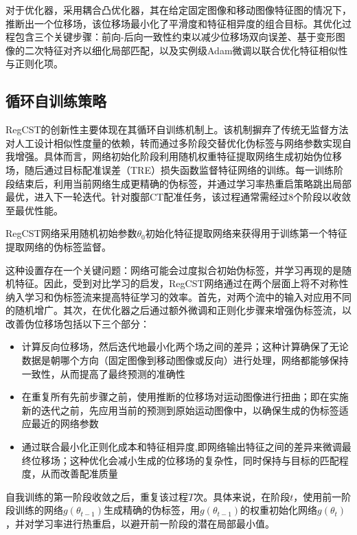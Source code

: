 对于优化器，采用耦合凸优化器\cite{siebert2022learn}，其在给定固定图像和移动图像特征图的情况下，推断出一个位移场，该位移场最小化了平滑度和特征相异度的组合目标。其优化过程包含三个关键步骤：前向-后向一致性约束以减少位移场双向误差、基于变形图像的二次特征对齐以细化局部匹配，以及实例级Adam微调以联合优化特征相似性与正则化项。

\subsection{循环自训练策略}

RegCST的创新性主要体现在其循环自训练机制上。该机制摒弃了传统无监督方法对人工设计相似性度量的依赖，转而通过多阶段交替优化伪标签与网络参数实现自我增强。具体而言，网络初始化阶段利用随机权重特征提取网络生成初始伪位移场，随后通过目标配准误差（TRE）损失函数监督特征网络的训练。每一训练阶段结束后，利用当前网络生成更精确的伪标签，并通过学习率热重启策略跳出局部最优，进入下一轮迭代。针对腹部CT配准任务，该过程通常需经过8个阶段以收敛至最优性能。

RegCST网络采用随机初始参数$\theta_0$初始化特征提取网络来获得用于训练第一个特征提取网络的伪标签监督。

这种设置存在一个关键问题：网络可能会过度拟合初始伪标签，并学习再现的是随机特征。因此，受到对比学习\cite{chen2021exploring}的启发，RegCST网络通过在两个层面上将不对称性纳入学习和伪标签流来提高特征学习的效率。首先，对两个流中的输入对应用不同的随机增广。其次，在优化器之后通过额外微调和正则化步骤来增强伪标签流，以改善伪位移场包括以下三个部分：

\begin{itemize}
    \item 计算反向位移场，然后迭代地最小化两个场之间的差异；这种计算确保了无论数据是朝哪个方向（固定图像到移动图像或反向）进行处理，网络都能够保持一致性，从而提高了最终预测的准确性
    \item 在重复所有先前步骤之前，使用推断的位移场对运动图像进行扭曲；即在实施新的迭代之前，先应用当前的预测到原始运动图像中，以确保生成的伪标签适应最近的网络参数
    \item 通过联合最小化正则化成本和特征相异度,即网络输出特征之间的差异来微调最终位移场；这种优化会减小生成的位移场的复杂性，同时保持与目标的匹配程度，从而改善配准质量
\end{itemize}

自我训练的第一阶段收敛之后，重复该过程$T$次。具体来说，在阶段$t$，使用前一阶段训练的网络$g(\theta_{t-1})$生成精确的伪标签，用$g(\theta_{t-1})$的权重初始化网络$g(\theta_{t})$，并对学习率进行热重启，以避开前一阶段的潜在局部最小值。

